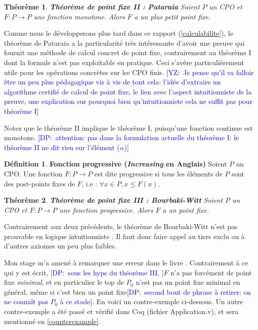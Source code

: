 \documentclass{article}
\newcommand{\yz}[1]{\textcolor{blue}{{[YZ:~#1]}}}
\newcommand\dam[1]{\textcolor{blue}{{[DP:~#1]}}}
\newtheorem{theorem}{Théorème}[section]
\theoremstyle{definition}
\newtheorem{definition}{Définition}[section]
\begin{document}
\begin{theorem}{\textbf{Théorème de point fixe II : Pataraia}}
Soient $P$ un CPO et $F : P \rightarrow P$ une fonction monotone. Alors $F$ a un plus petit point fixe.
\end{theorem}

Comme nous le développerons plus tard dans ce rapport (\ref{calculabilite}), le théorème de Pataraia a
la particularité très intéressante d'avoir une preuve qui fournit une méthode de calcul concret de point fixe, contrairement au théorème I dont la formule n'est pas exploitable en pratique. Ceci s'avère particulièrement utile pour les opérations concrètes sur les CPO finis. %
\yz{Je pense qu'il va falloir être un peu plus pédagogique vis à   vis de tout cela: l'idée d'extraire un algorithme certifié de calcul de point   fixe, le lien avec l'aspect intuitionniste de la preuve, une explication sur pourquoi bien qu’intuitionniste cela ne suffit pas pour théorème I}

Notez que le théorème II implique le théorème I, puisqu'une fonction continue est monotone.
\dam{attention: pas dans la formulation actuelle du théorème I: le théorème II ne dit rien sur l'élément ($\alpha$)}

\begin{definition}{\textbf{Fonction progressive (\textit{Increasing} en Anglais)}}
Soient $P$ un CPO. Une fonction $F : P \rightarrow P$ est dite progressive si tous les éléments de $P$ sont des post-points fixes de $F$, i.e : $\forall x \in P, x \leq F(x)$.

\end{definition}

\begin{theorem}{\textbf{Théorème de point fixe III : Bourbaki-Witt}}
Soient $P$ un CPO et $F : P \rightarrow P$ une fonction progressive. Alors $F$ a un point fixe.
\end{theorem}

Contrairement aux deux précédents, le théorème de Bourbaki-Witt n'est pas prouvable en logique intuitionniste \cite{bw}. Il faut donc faire appel au tiers exclu ou à d'autres axiomes un peu plus faibles.

Mon stage m'a amené à remarquer une erreur dans le livre \cite[page 188]{main}.
Contrairement à ce qui y est écrit, \dam{sous les hyps du théorème III, }$F$ n'a pas forcément de point fixe \emph{minimal}, et en particulier le top de $P_0$ n'est pas un point fixe minimal en général, même si c'est bien un point fixe\dam{second bout de phrase à retirer: on ne connaît pas $P_0$ à ce stade}. En voici un contre-exemple ci-dessous. Un autre contre-exemple a été passé et vérifié dans Coq (fichier Application.v), et sera mentionné en \ref{counterexample}.
\end{document}
